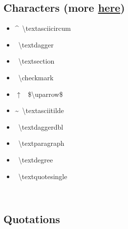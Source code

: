 
\subsection*{Characters (more \href{http://tug.ctan.org/info/symbols/comprehensive/symbols-a4.pdf}{here})}


\begin{minipage}{3cm}
\begin{itemize}[label=\empty,leftmargin=*]
    \item \textasciicircum \, \textbackslash textasciicircum
    \item \textdagger \, \textbackslash textdagger
    \item \textsection \, \textbackslash textsection
    \item \checkmark \, \textbackslash checkmark
    \item $\uparrow$ \, \$\textbackslash uparrow\$
\end{itemize} 
\end{minipage}
\begin{minipage}{3cm}
\begin{itemize}[label={},leftmargin=*]
    \item \textasciitilde \, \textbackslash textasciitilde
    \item \textdaggerdbl \, \textbackslash textdaggerdbl
    \item \textparagraph \, \textbackslash textparagraph
    \item \textdegree \, \textbackslash textdegree
    \item \textquotesingle \, \textbackslash textquotesingle
\end{itemize} 
\end{minipage}\ \\


\subsection*{Quotations}

\\
\\
\\
\\



